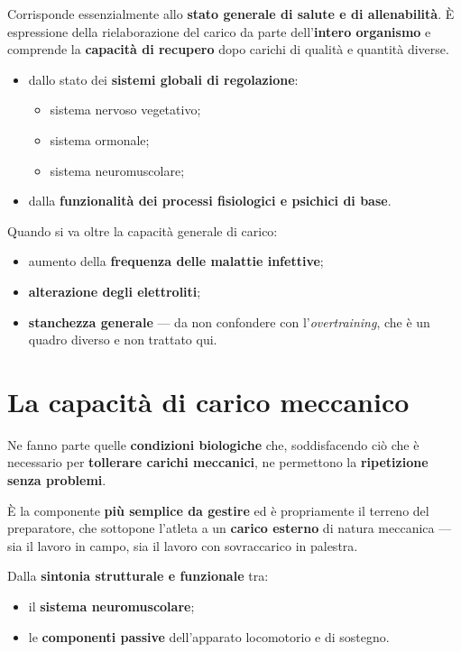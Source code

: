 Corrisponde essenzialmente allo \textbf{stato generale di salute e di allenabilità}. È espressione
della rielaborazione del carico da parte dell'\textbf{intero organismo} e comprende la
\textbf{capacità di recupero} dopo carichi di qualità e quantità diverse.

\begin{itemize}
  \item dallo stato dei \textbf{sistemi globali di regolazione}:
    \begin{itemize}
      \item sistema nervoso vegetativo;
      \item sistema ormonale;
      \item sistema neuromuscolare;
    \end{itemize}
  \item dalla \textbf{funzionalità dei processi fisiologici e psichici di base}.
\end{itemize}

Quando si va oltre la capacità generale di carico:
\begin{itemize}
  \item aumento della \textbf{frequenza delle malattie infettive};
  \item \textbf{alterazione degli elettroliti};
  \item \textbf{stanchezza generale} --- da non confondere con l'\textit{overtraining}, che è un
    quadro diverso e non trattato qui.
\end{itemize}

\section{La capacità di carico meccanico}

Ne fanno parte quelle \textbf{condizioni biologiche} che, soddisfacendo ciò che è necessario per
\textbf{tollerare carichi meccanici}, ne permettono la \textbf{ripetizione senza problemi}.

È la componente \textbf{più semplice da gestire} ed è propriamente il terreno del preparatore, che
sottopone l'atleta a un \textbf{carico esterno} di natura meccanica --- sia il lavoro in campo, sia
il lavoro con sovraccarico in palestra.

Dalla \textbf{sintonia strutturale e funzionale} tra:
\begin{itemize}
  \item il \textbf{sistema neuromuscolare};
  \item le \textbf{componenti passive} dell'apparato locomotorio e di sostegno.
\end{itemize}


